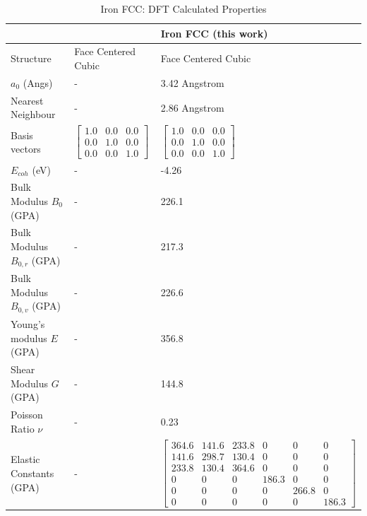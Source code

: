



\renewcommand{\arraystretch}{1.7}
\begin{table}[ht]
\renewcommand{\arraystretch}{1.2}
\begin{tabular}{lll}
\hline\hline
& & Iron FCC (this work)  \\
\hline\hline
Structure                    & Face Centered Cubic & Face Centered Cubic  \\
$a_0$ (Angs)                 & - & 3.42 Angstrom \\
Nearest Neighbour            & - & 2.86 Angstrom \\
Basis vectors                & $\begin{bmatrix} 1.0 & 0.0 & 0.0 \\ 0.0 & 1.0 & 0.0 \\ 0.0 & 0.0 & 1.0 \end{bmatrix}$ & $\begin{bmatrix} 1.0 & 0.0 & 0.0 \\ 0.0 & 1.0 & 0.0 \\ 0.0 & 0.0 & 1.0 \end{bmatrix}$ \\
$E_{coh}$ (eV)               & - & -4.26 \\
Bulk Modulus $B_0$ (GPA)     & - & 226.1 \\
Bulk Modulus $B_{0,r}$ (GPA) & -    &  217.3 \\
Bulk Modulus $B_{0,v}$ (GPA) & -    &  226.6 \\
Young's modulus $E$ (GPA)    & - & 356.8 \\
Shear Modulus $G$ (GPA)      & - & 144.8 \\
Poisson Ratio $\nu$          & - & 0.23 \\
Elastic Constants (GPA)      & - & $\begin{bmatrix} 364.6 & 141.6 & 233.8 & 0 & 0 & 0 \\ 141.6 & 298.7 & 130.4 & 0 & 0 & 0 \\ 233.8 & 130.4 & 364.6 & 0 & 0 & 0 \\ 0 & 0 & 0 & 186.3 & 0 & 0 \\ 0 & 0 & 0 & 0 & 266.8 & 0 \\ 0 & 0 & 0 & 0 & 0 & 186.3 \end{bmatrix}$ \\
\hline\hline
\end{tabular}
\caption{Iron FCC: DFT Calculated Properties}
\label{table:fefccexperimentaldft}
\end{table}




